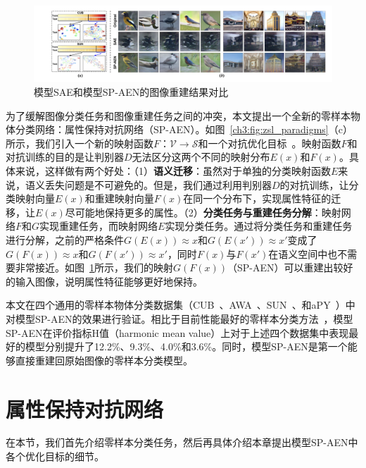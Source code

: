 \begin{figure}[t]
    \centering
        \includegraphics[width=\linewidth]{chapter3/res/reconstruction_visualization.pdf}
    \caption{模型SAE和模型SP-AEN的图像重建结果对比}
    \label{ch3:fig:reconstruction_visualization}
\end{figure}

为了缓解图像分类任务和图像重建任务之间的冲突，本文提出一个全新的零样本物体分类网络：属性保持对抗网络（SP-AEN）。如图~\ref{ch3:fig:zsl_paradigms}（c）所示，我们引入一个新的映射函数$F$：$\mathcal{V}\rightarrow \mathcal{S}$和一个对抗优化目标~\cite{goodfellow2014generative}。映射函数$F$和对抗训练的目的是让判别器$D$无法区分这两个不同的映射分布$E(x)$和$F(x)$。具体来说，这样做有两个好处：（1）\textbf{语义迁移}：虽然对于单独的分类映射函数$E$来说，语义丢失问题是不可避免的。但是，我们通过利用判别器$D$的对抗训练，让分类映射向量$E(x)$和重建映射向量$F(x)$在同一个分布下，实现属性特征的迁移，让$E(x)$尽可能地保持更多的属性。（2）\textbf{分类任务与重建任务分解}：映射网络$F$和$G$实现重建任务，而映射网络$E$实现分类任务。通过将分类任务和重建任务进行分解，之前的严格条件$G(E(x)) \approx x$和$G(E(x')) \approx x'$变成了$G(F(x))\approx x$和$G(F(x'))\approx x'$，同时$F(x)$与$F(x')$在语义空间中也不需要非常接近。如图~\ref{ch3:fig:reconstruction_visualization}所示，我们的映射$G(F(x))$（SP-AEN）可以重建出较好的输入图像，说明属性特征能够更好地保持。

本文在四个通用的零样本物体分类数据集（CUB~\cite{wah2011caltech}、AWA~\cite{lampert2009learning}、SUN~\cite{patterson2012sun}、和aPY~\cite{farhadi2009describing}）中对模型SP-AEN的效果进行验证。相比于目前性能最好的零样本分类方法~\cite{xian2017zero}，模型SP-AEN在评价指标H值（harmonic mean value）上对于上述四个数据集中表现最好的模型分别提升了12.2\%、9.3\%、4.0\%和3.6\%。同时，模型SP-AEN是第一个能够直接重建回原始图像的零样本分类模型。


\section{属性保持对抗网络}

在本节，我们首先介绍零样本分类任务，然后再具体介绍本章提出模型SP-AEN中各个优化目标的细节。


